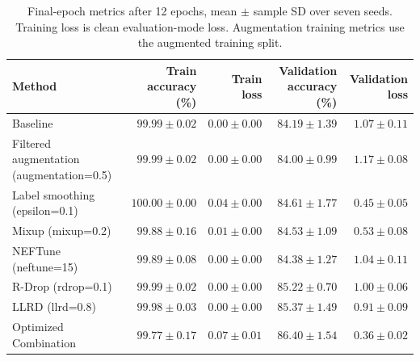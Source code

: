 \begin{table}[tp]
\centering\small\setlength{\tabcolsep}{4pt}
\caption{Final-epoch metrics after 12 epochs, mean $\pm$ sample SD over seven seeds. Training loss is clean evaluation-mode loss. Augmentation training metrics use the augmented training split.}
\label{tab:evaluation-matrix}
\begin{tabular}{p{}rrrr}
\toprule
Method & Train accuracy (\%) & Train loss & Validation accuracy (\%) & Validation loss \\
\midrule
Baseline & $99.99 \pm 0.02$ & $0.00 \pm 0.00$ & $84.19 \pm 1.39$ & $1.07 \pm 0.11$ \\
Filtered augmentation (augmentation=0.5) & $99.99 \pm 0.02$ & $0.00 \pm 0.00$ & $84.00 \pm 0.99$ & $1.17 \pm 0.08$ \\
Label smoothing (epsilon=0.1) & $100.00 \pm 0.00$ & $0.04 \pm 0.00$ & $84.61 \pm 1.77$ & $0.45 \pm 0.05$ \\
Mixup (mixup=0.2) & $99.88 \pm 0.16$ & $0.01 \pm 0.00$ & $84.53 \pm 1.09$ & $0.53 \pm 0.08$ \\
NEFTune (neftune=15) & $99.89 \pm 0.08$ & $0.00 \pm 0.00$ & $84.38 \pm 1.27$ & $1.04 \pm 0.11$ \\
R-Drop (rdrop=0.1) & $99.99 \pm 0.02$ & $0.00 \pm 0.00$ & $85.22 \pm 0.70$ & $1.00 \pm 0.06$ \\
LLRD (llrd=0.8) & $99.98 \pm 0.03$ & $0.00 \pm 0.00$ & $85.37 \pm 1.49$ & $0.91 \pm 0.09$ \\
Optimized Combination & $99.77 \pm 0.17$ & $0.07 \pm 0.01$ & $86.40 \pm 1.54$ & $0.36 \pm 0.02$ \\
\bottomrule
\end{tabular}
\end{table}
